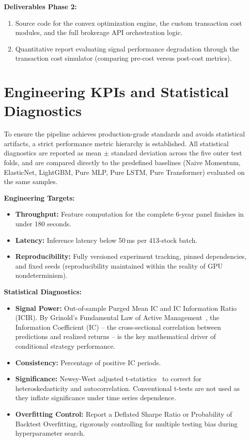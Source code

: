 \documentclass[twoside,final]{hcmut-report}
\begin{document}
\vspace{0.5em}
\textbf{Deliverables Phase 2:}
\begin{enumerate}
    \item Source code for the convex optimization engine, the custom transaction cost modules, and the full brokerage API orchestration logic.
    \item Quantitative report evaluating signal performance degradation through the transaction cost simulator (comparing pre-cost versus post-cost metrics).
\end{enumerate}

\section{Engineering KPIs and Statistical Diagnostics}

To ensure the pipeline achieves production-grade standards and avoids statistical artifacts, a strict performance metric hierarchy is established. All statistical diagnostics are reported as mean $\pm$ standard deviation across the five outer test folds, and are compared directly to the predefined baselines (Naive Momentum, ElasticNet, LightGBM, Pure MLP, Pure LSTM, Pure Transformer) evaluated on the same samples.

\textbf{Engineering Targets:}
\begin{itemize}
    \item \textbf{Throughput:} Feature computation for the complete 6-year panel finishes in under 180 seconds.
    \item \textbf{Latency:} Inference latency below 50\,ms per 413-stock batch.
    \item \textbf{Reproducibility:} Fully versioned experiment tracking, pinned dependencies, and fixed seeds (reproducibility maintained within the reality of GPU nondeterminism).
\end{itemize}

\textbf{Statistical Diagnostics:}
\begin{itemize}
    \item \textbf{Signal Power:} Out-of-sample Purged Mean IC and IC Information Ratio (ICIR). By Grinold's Fundamental Law of Active Management~\cite{Grinold1989}, the Information Coefficient (IC) -- the cross-sectional correlation between predictions and realized returns -- is the key mathematical driver of conditional strategy performance.
    \item \textbf{Consistency:} Percentage of positive IC periods.
    \item \textbf{Significance:} Newey-West adjusted t-statistics~\cite{NeweyWest1987} to correct for heteroskedasticity and autocorrelation. Conventional t-tests are not used as they inflate significance under time series dependence.
    \item \textbf{Overfitting Control:} Report a Deflated Sharpe Ratio or Probability of Backtest Overfitting, rigorously controlling for multiple testing bias during hyperparameter search.
\end{itemize}
\end{document}
